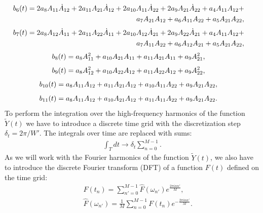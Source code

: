 \documentclass{article}
\begin{document}
\begin{eqnarray}\label{b6}
    &&\mkern-36mu b_{6}(t) = 2 a_8 A_{11} \dot{A}_{12}+2 a_{11} A_{21} \dot{A}_{12}+2 a_{10} A_{11} \dot{A}_{22}+2 a_9 A_{21} \dot{A}_{22}+a_4 A_{11} A_{12}+\nonumber\\
    &&\mkern-36mu a_7 A_{21} A_{12}+a_6 A_{11} A_{22}+a_5 A_{21} A_{22},
\end{eqnarray}
\begin{eqnarray}\label{b7}
    &&\mkern-36mu b_{7}(t) = 2 a_8 A_{12} \dot{A}_{11}+2 a_{11} A_{22} \dot{A}_{11}+2 a_{10} A_{12} \dot{A}_{21}+2 a_9 A_{22} \dot{A}_{21}+a_4 A_{11} A_{12}+\nonumber\\
    &&\mkern-36mu a_7 A_{11} A_{22}+a_6 A_{12} A_{21}+a_5 A_{21} A_{22},
\end{eqnarray}
\begin{eqnarray}\label{b8}
    &&\mkern-36mu b_{8}(t) = a_8 A_{11}^2+a_{10} A_{21} A_{11}+a_{11} A_{21} A_{11}+a_9 A_{21}^2,
\end{eqnarray}
\begin{eqnarray}\label{b9}
    &&\mkern-36mu b_{9}(t) = a_8 A_{12}^2+a_{10} A_{22} A_{12}+a_{11} A_{22} A_{12}+a_9 A_{22}^2,
\end{eqnarray}
\begin{eqnarray}\label{b10}
    &&\mkern-36mu b_{10}(t) = a_8 A_{11} A_{12}+a_{11} A_{21} A_{12}+a_{10} A_{11} A_{22}+a_9 A_{21} A_{22},
\end{eqnarray}
\begin{eqnarray}\label{b11}
    &&\mkern-36mu b_{11}(t) = a_8 A_{11} A_{12}+a_{10} A_{21} A_{12}+a_{11} A_{11} A_{22}+a_9 A_{21} A_{22}.
\end{eqnarray}
To perform the integration over the high-frequency harmonics of the function $\tilde{Y}(t)$ we have to introduce a discrete time grid with the discretization step $\delta_t = 2\pi/W'$. The integrals over time are replaced with sums: 
\begin{eqnarray}
    \int_{T} dt \rightarrow \delta_t \sum_{n=0}^{M-1}.
\end{eqnarray}
As we will work with the Fourier harmonics of the function $\tilde{Y}(t)$, we also have to introduce the discrete Fourier transform (DFT) of a function $F(t)$ defined on the time grid:
\begin{eqnarray}
    &&F(t_{n}) = \sum_{n'=0}^{M-1} \hat{F}(\omega_{n'}) e^{\frac{2\pi i n n'}{M}},\label{BDFT1}\\
    &&\hat{F}(\omega_{n'}) = \frac{1}{M}\sum_{n=0}^{M-1} F(t_{n}) e^{-\frac{2\pi i n n'}{M}}.\label{BDFT2}
\end{eqnarray}
\end{document}
